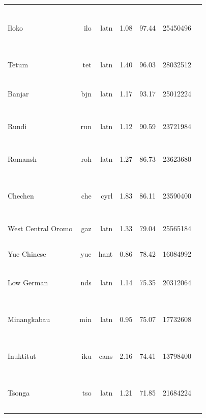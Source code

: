 \documentclass[11pt]{article}
\begin{document}
\begin{center}
\begin{longtable}[width=0.9\textwidth]{|lrrrrrl|}
Iloko & ilo & latn & 1.08 & 97.44 & 25450496 & {\color{oscar}\rule{0.02cm}{8pt}}{\color{nllb}\rule{1.67cm}{8pt}}{\color{madlad400}\rule{1.43cm}{8pt}}{\color{glot500}\rule{0.49cm}{8pt}}{\color{other}\rule{0.3899999999999997cm}{8pt}} \\ 
Tetum & tet & latn & 1.40 & 96.03 & 28032512 & {\color{madlad400}\rule{3.93cm}{8pt}}{\color{other}\rule{0.06999999999999984cm}{8pt}} \\ 
Banjar & bjn & latn & 1.17 & 93.17 & 25012224 & {\color{nllb}\rule{3.61cm}{8pt}}{\color{glot500}\rule{0.24cm}{8pt}}{\color{other}\rule{0.15000000000000036cm}{8pt}} \\ 
Rundi & run & latn & 1.12 & 90.59 & 23721984 & {\color{nllb}\rule{3.31cm}{8pt}}{\color{glot500}\rule{0.68cm}{8pt}}{\color{other}\rule{0.009999999999999787cm}{8pt}} \\ 
Romansh & roh & latn & 1.27 & 86.73 & 23623680 & {\color{oscar}\rule{0.0cm}{8pt}}{\color{madlad400}\rule{2.24cm}{8pt}}{\color{glot500}\rule{1.39cm}{8pt}}{\color{other}\rule{0.3700000000000001cm}{8pt}} \\ 
Chechen & che & cyrl & 1.83 & 86.11 & 23590400 & {\color{oscar}\rule{0.16cm}{8pt}}{\color{madlad400}\rule{0.95cm}{8pt}}{\color{glot500}\rule{0.96cm}{8pt}}{\color{other}\rule{1.9300000000000002cm}{8pt}} \\ 
West Central Oromo & gaz & latn & 1.33 & 79.04 & 25565184 & {\color{nllb}\rule{3.84cm}{8pt}}{\color{other}\rule{0.16000000000000014cm}{8pt}} \\ 
Yue Chinese & yue & hant & 0.86 & 78.42 & 16084992 & {\color{glot500}\rule{1.89cm}{8pt}}{\color{other}\rule{2.1100000000000003cm}{8pt}} \\ 
Low German & nds & latn & 1.14 & 75.35 & 20312064 & {\color{oscar}\rule{0.27cm}{8pt}}{\color{glot500}\rule{2.37cm}{8pt}}{\color{other}\rule{1.3599999999999999cm}{8pt}} \\ 
Minangkabau & min & latn & 0.95 & 75.07 & 17732608 & {\color{nllb}\rule{0.79cm}{8pt}}{\color{madlad400}\rule{0.23cm}{8pt}}{\color{glot500}\rule{1.83cm}{8pt}}{\color{other}\rule{1.15cm}{8pt}} \\ 
Inuktitut & iku & cans & 2.16 & 74.41 & 13798400 & {\color{madlad400}\rule{0.28cm}{8pt}}{\color{glot500}\rule{1.7cm}{8pt}}{\color{other}\rule{2.02cm}{8pt}} \\ 
Tsonga & tso & latn & 1.21 & 71.85 & 21684224 & {\color{nllb}\rule{2.28cm}{8pt}}{\color{madlad400}\rule{1.2cm}{8pt}}{\color{glot500}\rule{0.5cm}{8pt}}{\color{other}\rule{0.020000000000000462cm}{8pt}} \\ 

\end{longtable}
\end{center}
\end{document}
